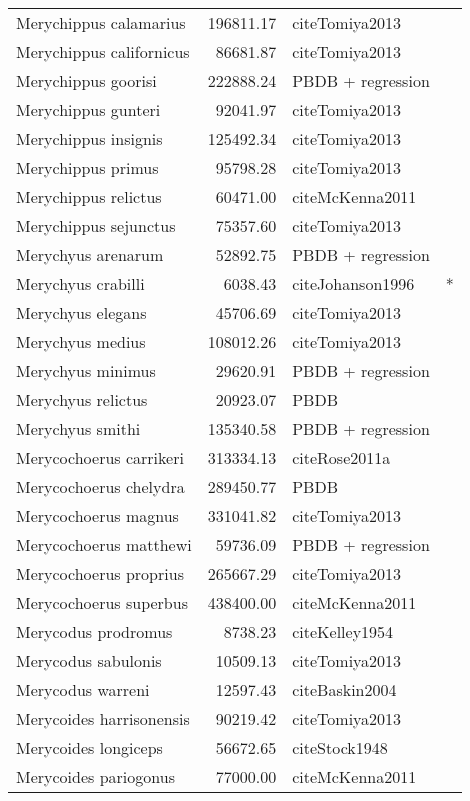 \begin{table}[ht]
\begin{tabular}{lrll}
  Merychippus calamarius & 196811.17 & cite{Tomiya2013} &  \\ 
  Merychippus californicus & 86681.87 & cite{Tomiya2013} &  \\ 
  Merychippus goorisi & 222888.24 & PBDB + regression &  \\ 
  Merychippus gunteri & 92041.97 & cite{Tomiya2013} &  \\ 
  Merychippus insignis & 125492.34 & cite{Tomiya2013} &  \\ 
  Merychippus primus & 95798.28 & cite{Tomiya2013} &  \\ 
  Merychippus relictus & 60471.00 & cite{McKenna2011} &  \\ 
  Merychippus sejunctus & 75357.60 & cite{Tomiya2013} &  \\ 
  Merychyus arenarum & 52892.75 & PBDB + regression &  \\ 
  Merychyus crabilli & 6038.43 & cite{Johanson1996} & * \\ 
  Merychyus elegans & 45706.69 & cite{Tomiya2013} &  \\ 
  Merychyus medius & 108012.26 & cite{Tomiya2013} &  \\ 
  Merychyus minimus & 29620.91 & PBDB + regression &  \\ 
  Merychyus relictus & 20923.07 & PBDB &  \\ 
  Merychyus smithi & 135340.58 & PBDB + regression &  \\ 
  Merycochoerus carrikeri & 313334.13 & cite{Rose2011a} &  \\ 
  Merycochoerus chelydra & 289450.77 & PBDB &  \\ 
  Merycochoerus magnus & 331041.82 & cite{Tomiya2013} &  \\ 
  Merycochoerus matthewi & 59736.09 & PBDB + regression &  \\ 
  Merycochoerus proprius & 265667.29 & cite{Tomiya2013} &  \\ 
  Merycochoerus superbus & 438400.00 & cite{McKenna2011} &  \\ 
  Merycodus prodromus & 8738.23 & cite{Kelley1954} &  \\ 
  Merycodus sabulonis & 10509.13 & cite{Tomiya2013} &  \\ 
  Merycodus warreni & 12597.43 & cite{Baskin2004} &  \\ 
  Merycoides harrisonensis & 90219.42 & cite{Tomiya2013} &  \\ 
  Merycoides longiceps & 56672.65 & cite{Stock1948} &  \\ 
  Merycoides pariogonus & 77000.00 & cite{McKenna2011} &  \\ 

\end{tabular}
\end{table}

